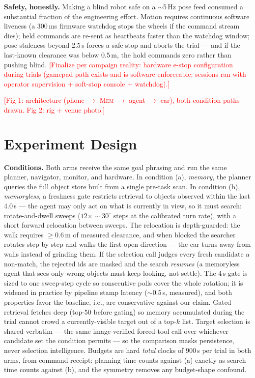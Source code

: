 \documentclass{article}
\newcommand{\todo}[1]{\textcolor{red}{[#1]}}
\newcommand{\rtsm}{\textsc{Mem}} %
\begin{document}
\textbf{Safety, honestly.} Making a blind robot safe on a
$\sim$5\,Hz pose feed consumed a substantial fraction of the
engineering effort. Motion requires continuous software liveness (a
300\,ms firmware watchdog stops the wheels if the command stream dies);
held commands are re-sent as heartbeats faster than the watchdog
window; pose staleness beyond 2.5\,s forces a safe stop and aborts the
trial --- and if the last-known clearance was below 0.5\,m, the hold
commands zero rather than pushing blind. \todo{Finalize per campaign
reality: hardware e-stop configuration during trials (gamepad path
exists and is software-enforceable; sessions ran with operator
supervision + soft-stop console + watchdog).}

\todo{Fig 1: architecture (phone $\to$ \rtsm{} $\to$ agent $\to$ car),
both condition paths drawn. Fig 2: rig + venue photo.}

\section{Experiment Design}
\label{sec:design}

\textbf{Conditions.} Both arms receive the same goal phrasing and run
the same planner, navigator, monitor, and hardware. In condition (a),
\emph{memory}, the planner queries the full object store built from a
single pre-task scan. In condition (b), \emph{memoryless}, a freshness
gate restricts retrieval to objects observed within the last 4.0\,s ---
the agent may only act on what is currently in view, so it must search:
rotate-and-dwell sweeps ($12\times{\sim}30^\circ$ steps at the
calibrated turn rate), with a short forward relocation between sweeps.
The relocation is depth-guarded: the walk requires $\geq$0.6\,m of
measured clearance, and when blocked the searcher rotates step by step
and walks the first open direction --- the car turns away from walls
instead of grinding them. If the selection call judges every fresh
candidate a non-match, the rejected ids are masked and the search
\emph{resumes} (a memoryless agent that sees only wrong objects must
keep looking, not settle). The 4\,s gate is sized to one sweep-step
cycle so consecutive polls cover the whole rotation; it is widened in
practice by pipeline stamp latency ($\sim$0.5\,s, measured), and both
properties favor the baseline, i.e., are conservative against our
claim. Gated retrieval fetches deep (top-50 before gating) so memory
accumulated during the trial cannot crowd a currently-visible target
out of a top-$k$ list. Target selection is shared verbatim --- the same
image-verified forced-tool call over whichever candidate set the
condition permits --- so the comparison masks persistence, never
selection intelligence. Budgets are hard \emph{total} clocks of 900\,s
per trial in both arms, from command receipt: planning time counts
against (a) exactly as search time counts against (b), and the symmetry
removes any budget-shape confound.
\end{document}
